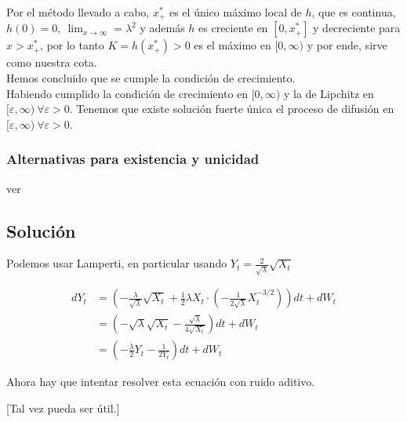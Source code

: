 \documentclass[12pt]{article}
\begin{document}
Por el método llevado a cabo, $x^*_+$ es el único máximo local de $h$, que es continua, $h(0) = 0,\ \lim_{x\to \infty} = \lambda^2$ y además $h$ es creciente en $[0,x^*_+]$ y decreciente para $x>x^*_+$, por lo tanto $K = h(x^*_+)>0$ es el máximo en $[0,\infty)$ y por ende, sirve como nuestra cota.\\

Hemos concluido que se cumple la condición de crecimiento.\\


Habiendo cumplido la condición de crecimiento en $[0,\infty)$ y la de Lipchitz en $[\varepsilon, \infty) \ \forall \varepsilon > 0.$ Tenemos que existe solución fuerte única el proceso de difusión en $[\varepsilon, \infty)\ \forall \varepsilon > 0.$



\subsubsection*{Alternativas para existencia y unicidad}
ver \cite{YamadaWatanabe1971}

\subsection*{Solución}
Podemos usar Lamperti, en particular usando $Y_t = \frac{2}{\sqrt{\lambda}}\sqrt{X_t}$

\begin{align*}
	dY_t &= \left(-\frac{\lambda}{\sqrt{\lambda}}\sqrt{X_t} + \frac{1}{2}\lambda X_t \cdot \left(-\frac{1}{2\sqrt{\lambda}}X_t^{-3/2}\right)\right)dt + dW_t \\
	&= \left(-\sqrt{\lambda}\sqrt{X_t} - \frac{\sqrt{\lambda}}{4\sqrt{X_t}}\right)dt + dW_t \\
	&= \left(-\frac{\lambda}{2}Y_t - \frac{1}{2Y_t}\right)dt + dW_t
\end{align*}

Ahora hay que intentar resolver esta ecuación con ruido aditivo.

[Tal vez \cite{MasoliverPerello2012} pueda ser útil.]

	

\printbibliography	
\end{document}
